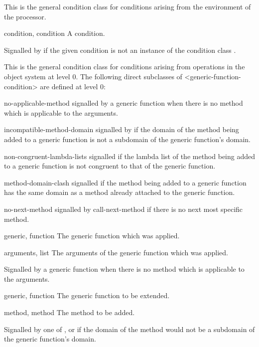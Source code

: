 \begin{optDefinition}
%
This is the general condition class for conditions arising from the
environment of the processor.

%
\begin{initoptions}
    \item[condition, condition] A condition.
\end{initoptions}
%
Signalled by  if the given condition is not an instance of
the condition class .

%
This is the general condition class for conditions arising from operations in
the object system at level 0. The following direct subclasses of
<generic-function-condition> are defined at level 0:
%
\begin{subclasses}
    \item[no-applicable-method] signalled by a generic function when there is
    no method which is applicable to the arguments.
    \item[incompatible-method-domain] signalled by if the domain of the method
    being added to a generic function is not a subdomain of the generic
    function's domain.
    \item[non-congruent-lambda-lists] signalled if the lambda list of the
    method being added to a generic function is not congruent to that of the
    generic function.
    \item[method-domain-clash] signalled if the method being added to a
    generic function has the same domain as a method already attached to the
    generic function.
    \item[no-next-method] signalled by call-next-method if there is no next
    most specific method.
\end{subclasses}
%
%
\begin{initoptions}
    \item[generic, function] The generic function which was applied.
    \item[arguments, list] The arguments of the generic function which was
    applied.
\end{initoptions}
%
\remarks%
Signalled by a generic function when there is no method which is applicable to
the arguments.

%
\begin{initoptions}
    \item[generic, function] The generic function to be extended.
    \item[method, method] The method to be added.
\end{initoptions}
%
\remarks%
Signalled by one of ,  or
 if the domain of the method would not be a subdomain
of the generic function's domain.


\end{optDefinition}
